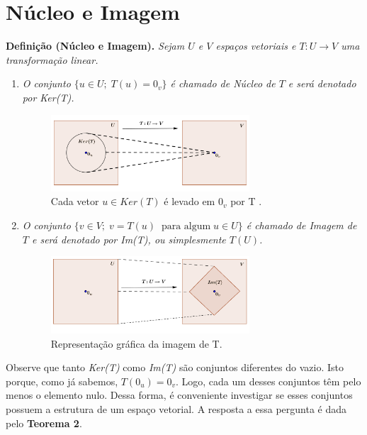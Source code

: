 \section{Núcleo e Imagem}
\textbf{Definição (Núcleo e Imagem).} \textit{Sejam $U$  e $V$ espaços vetoriais e $T: U \rightarrow V$ uma transformação linear. }

\begin{enumerate}%
\item \textit{O conjunto $\{ u\in U; \;T(u)=0_v\}$ é chamado de \textit{Núcleo de $T$} e será denotado por \textit{Ker(T)}.}

\begin{figure}[h]
\center
\includegraphics[width=0.70\textwidth]{chapters/transformacoes_lineares/img/kert1}
\caption{\footnotesize{Cada vetor $u \in Ker(T)$ é levado  em $0_v$ por  T .}}
\label{fig:exp}
\end{figure}


\item \textit{O conjunto $\{ v \in V;  \; v=T(u) \; \; \text{para algum}\; u\in U\}$ é chamado de \textit{Imagem de $T$} e será denotado por \textit{Im(T)}, ou simplesmente $T(U)$.}

\begin{figure}[h!]
\center
\includegraphics[width=0.70\textwidth]{chapters/transformacoes_lineares/img/imt1}
\caption{\footnotesize{Representação gráfica da imagem de T.}}
\label{fig:exp}
\end{figure}

\end{enumerate}

Observe que tanto \textit{Ker(T)} como \textit{Im(T)} são conjuntos diferentes do vazio. Isto porque, como já  sabemos,  $T(0_u)=0_v$. Logo, cada um desses conjuntos têm pelo menos o elemento nulo. Dessa forma, é conveniente investigar se esses conjuntos possuem a estrutura de um espaço vetorial. A resposta a essa pergunta é dada pelo \textbf{Teorema 2}.





